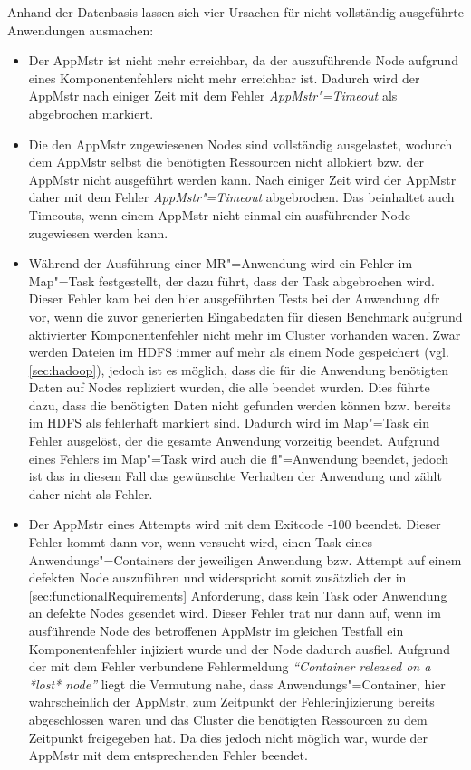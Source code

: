 Anhand der Datenbasis lassen sich vier Ursachen für nicht vollständig ausgeführte Anwendungen ausmachen:

\begin{itemize}
    \item
        Der \ac{AppMstr} ist nicht mehr erreichbar, da der auszuführende Node aufgrund eines Komponentenfehlers nicht mehr erreichbar ist.
        Dadurch wird der \ac{AppMstr} nach einiger Zeit mit dem Fehler \emph{\ac{AppMstr}"=Timeout} als abgebrochen markiert.
    \item
        Die den \ac{AppMstr} zugewiesenen Nodes sind vollständig ausgelastet, wodurch dem \ac{AppMstr} selbst die benötigten Ressourcen nicht allokiert bzw. der \ac{AppMstr} nicht ausgeführt werden kann.
        Nach einiger Zeit wird der \ac{AppMstr} daher mit dem Fehler \emph{\ac{AppMstr}"=Timeout} abgebrochen.
        Das beinhaltet auch Timeouts, wenn einem \ac{AppMstr} nicht einmal ein ausführender Node zugewiesen werden kann.
    \item
        Während der Ausführung einer \ac{MR}"=Anwendung wird ein Fehler im Map"=Task festgestellt, der dazu führt, dass der Task abgebrochen wird.
        Dieser Fehler kam bei den hier ausgeführten Tests bei der Anwendung \acl{dfr} vor, wenn die zuvor generierten Eingabedaten für diesen Benchmark aufgrund aktivierter Komponentenfehler nicht mehr im Cluster vorhanden waren.
        Zwar werden Dateien im \ac{HDFS} immer auf mehr als einem Node gespeichert (vgl. \autoref{sec:hadoop}), jedoch ist es möglich, dass die für die Anwendung benötigten Daten auf Nodes repliziert wurden, die alle beendet wurden.
        Dies führte dazu, dass die benötigten Daten nicht gefunden werden können bzw. bereits im \ac{HDFS} als fehlerhaft markiert sind.
        Dadurch wird im Map"=Task ein Fehler ausgelöst, der die gesamte Anwendung vorzeitig beendet.
        Aufgrund eines Fehlers im Map"=Task wird auch die \acl{fl}"=Anwendung beendet, jedoch ist das in diesem Fall das gewünschte Verhalten der Anwendung und zählt daher nicht als Fehler.
    \item
        Der \ac{AppMstr} eines Attempts wird mit dem Exitcode -100 beendet.
        Dieser Fehler kommt dann vor, wenn versucht wird, einen Task eines Anwendungs"=Containers der jeweiligen Anwendung bzw. Attempt auf einem defekten Node auszuführen und widerspricht somit zusätzlich der in \autoref{sec:functionalRequirements} Anforderung, dass kein Task oder Anwendung an defekte Nodes gesendet wird.
        Dieser Fehler trat nur dann auf, wenn im ausführende Node des betroffenen \ac{AppMstr} im gleichen Testfall ein Komponentenfehler injiziert wurde und der Node dadurch ausfiel.
        Aufgrund der mit dem Fehler verbundene Fehlermeldung \textit{\enquote{Container released on a *lost* node}} liegt die Vermutung nahe, dass Anwendungs"=Container, hier wahrscheinlich der \ac{AppMstr}, zum Zeitpunkt der Fehlerinjizierung bereits abgeschlossen waren und das Cluster die benötigten Ressourcen zu dem Zeitpunkt freigegeben hat.
        Da dies jedoch nicht möglich war, wurde der \ac{AppMstr} mit dem entsprechenden Fehler beendet.
\end{itemize}

